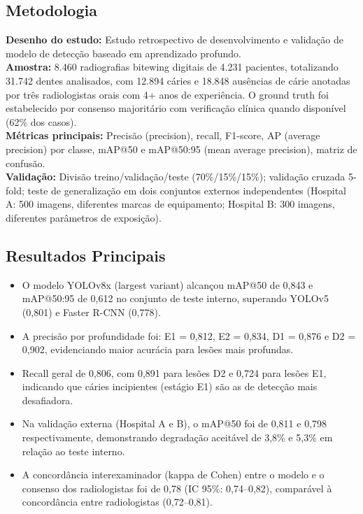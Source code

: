 \subsection{Metodologia}
\textbf{Desenho do estudo:} Estudo retrospectivo de desenvolvimento e
validação de modelo de detecção baseado em aprendizado profundo. \\
\textbf{Amostra:} 8.460 radiografias bitewing digitais de 4.231 pacientes,
totalizando 31.742 dentes analisados, com 12.894 cáries e 18.848 ausências
de cárie anotadas por três radiologistas orais com 4+ anos de experiência.
O ground truth foi estabelecido por consenso majoritário com verificação
clínica quando disponível (62\% dos casos). \\
\textbf{Métricas principais:} Precisão (precision), recall, F1-score,
AP (average precision) por classe, mAP@50 e mAP@50:95 (mean average
precision), matriz de confusão. \\
\textbf{Validação:} Divisão treino/validação/teste (70\%/15\%/15\%);
validação cruzada 5-fold; teste de generalização em dois conjuntos
externos independentes (Hospital A: 500 imagens, diferentes marcas de
equipamento; Hospital B: 300 imagens, diferentes parâmetros de exposição).

\subsection{Resultados Principais}
\begin{itemize}
  \item O modelo YOLOv8x (largest variant) alcançou mAP@50 de 0,843 e
        mAP@50:95 de 0,612 no conjunto de teste interno, superando
        YOLOv5 (0,801) e Faster R-CNN (0,778).
  \item A precisão por profundidade foi: E1 = 0,812, E2 = 0,834,
        D1 = 0,876 e D2 = 0,902, evidenciando maior acurácia para
        lesões mais profundas.
  \item Recall geral de 0,806, com 0,891 para lesões D2 e 0,724 para
        lesões E1, indicando que cáries incipientes (estágio E1) são
        as de detecção mais desafiadora.
  \item Na validação externa (Hospital A e B), o mAP@50 foi de 0,811
        e 0,798 respectivamente, demonstrando degradação aceitável de
        3,8\% e 5,3\% em relação ao teste interno.
  \item A concordância interexaminador (kappa de Cohen) entre o modelo e
        o consenso dos radiologistas foi de 0,78 (IC 95\%: 0,74--0,82),
        comparável à concordância entre radiologistas (0,72--0,81).
\end{itemize}

